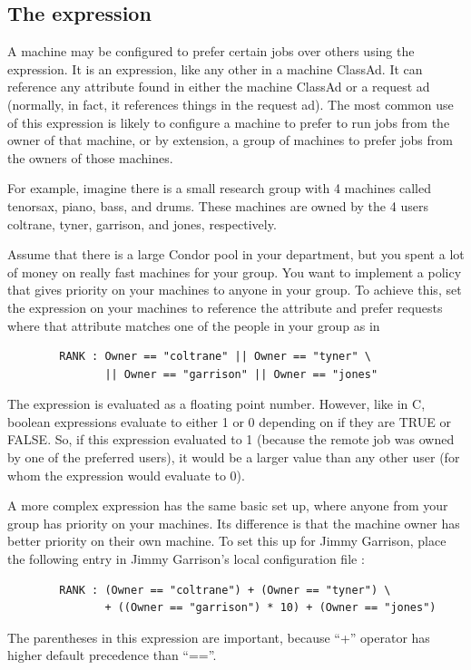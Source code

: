 \subsection{\label{sec:Rank-Expression}
The  expression}

A machine may be configured to prefer certain jobs over others
using the  expression.
It is an
expression, like any other in a machine ClassAd.
It can
reference any attribute found in either the machine ClassAd or a
request ad (normally, in fact, it references things in the request
ad).
The most common use of this expression is likely to configure a
machine to prefer to run jobs from the owner of that machine, or by
extension, a group of machines to prefer jobs from the owners of those
machines.

For example, imagine there is a small research group with 4 machines
called tenorsax, piano, bass, and drums.
These machines are owned by the 4 users
coltrane, tyner, garrison, and jones,
respectively.  

Assume that there is a large Condor pool in your department,
but you spent a lot of money on really fast machines for your group.
You want to implement a policy
that gives priority on your machines to
anyone in your group.
To achieve this, set the 
expression on your machines to reference the  attribute and
prefer requests where that attribute matches one of the people in your
group as in
\begin{verbatim}
        RANK : Owner == "coltrane" || Owner == "tyner" \
               || Owner == "garrison" || Owner == "jones"
\end{verbatim}

The  expression is evaluated as a floating point number.
However, like in C, boolean expressions evaluate to either 1 or 0
depending on if they are TRUE or FALSE.
So, if this expression
evaluated to 1 (because the remote job was owned by one of the 
preferred users), it would be a larger value than any other
user (for whom the expression would evaluate to 0).

A more complex  expression
has the same basic set up,
where anyone from your group has priority on your machines.
Its difference is that
the machine owner has better priority on their own machine.
To set this up for Jimmy Garrison,
place the following entry in Jimmy Garrison's local
configuration file :
\begin{verbatim}
        RANK : (Owner == "coltrane") + (Owner == "tyner") \
               + ((Owner == "garrison") * 10) + (Owner == "jones")
\end{verbatim}
\Note The parentheses in this expression are important, because ``+''
      operator has higher default precedence than ``==''.

